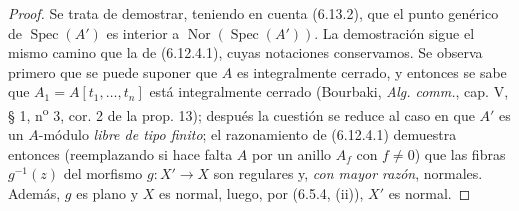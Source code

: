 \begin{proof}
Se trata de demostrar, teniendo en cuenta (6.13.2), que el punto
genérico de $\operatorname{Spec}(A')$ es interior a
$\operatorname{Nor}(\operatorname{Spec}(A'))$. La demostración sigue
el mismo camino que la de (6.12.4.1), cuyas notaciones conservamos.
Se observa primero que se puede suponer que $A$ es integralmente
cerrado, y entonces se sabe que $A_1=A[t_1,\ldots,t_n]$ está
integralmente cerrado (Bourbaki, \emph{Alg. comm.}, cap. V, § 1, n\textsuperscript{o} 3,
cor. 2 de la prop. 13); después la cuestión se reduce al caso en que $A'$ es
un $A$-módulo \emph{libre de tipo finito}; el razonamiento de (6.12.4.1)
demuestra entonces (reemplazando si hace falta $A$ por un anillo
$A_f$ con $f\neq0$) que las fibras $g^{-1}(z)$ del morfismo
$g:X'\to X$ son regulares y, \emph{con mayor razón}, normales. Además,
$g$ es plano y $X$ es normal, luego, por (6.5.4, (ii)), $X'$ es normal.
\end{proof}
